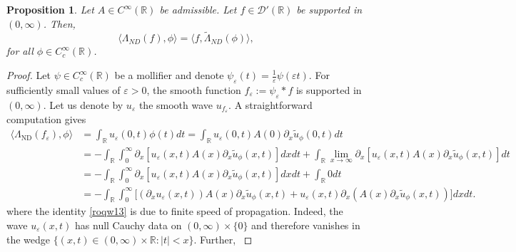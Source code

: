 \documentclass[10pt,a4paper]{article}
\theoremstyle{plain}
\newtheorem{proposition}[theorem]{Proposition}
\theoremstyle{definition}
\theoremstyle{remark}
\numberwithin{equation}{section}
\newcommand{\R}{\mathbb{R}}
\newcommand{\ND}{\Lambda_{\text{ND}}}
\begin{document}
\begin{proposition}\label{prop:integration-by-parts}
Let $A \in C^\infty(\R)$ be admissible. 
Let $f \in \mathcal{D}'(\R)$ be supported in $(0,\infty)$. 
Then, 
  \begin{equation}
  \langle \Lambda_{ND} (f), \phi \rangle =    \langle f , \tilde\Lambda_{ND} ( \phi )  \rangle, 
  \end{equation}
   {for all   $\phi \in C_c^\infty(\R)$.}
\end{proposition}
\begin{proof}
Let $\psi  \in C_c^\infty(\R)$ be a mollifier and denote $\psi_\varepsilon(t) = \frac{1}{\varepsilon} \psi ( \varepsilon t)$. 
For  sufficiently small values of $\varepsilon >0 $, the smooth function $f_\varepsilon := \psi_\varepsilon *  f $ is supported in $(0,\infty)$. 
Let us denote by $u_\varepsilon  $ the smooth wave $u_{f_\varepsilon}$. 
A straightforward computation gives 
\begin{align}
\langle  \ND (f_\varepsilon), \phi \rangle &= \int_{\R} u_{\varepsilon} (0,t)  \phi (t) dt =  \int_{\R} u_{\varepsilon} (0,t) A(0) \partial_x \tilde{u}_{\phi} (0,t)   dt \\
& {= - \int_{\R} \int_0^\infty   \partial_x [   u_{\varepsilon} (x,t)  A(x)  \partial_x \tilde{u}_{\phi} (x,t)   ]  dx dt 
+
 \int_{\R} \lim_{x \to \infty}  \partial_x [   u_{\varepsilon} (x,t)  A(x)  \partial_x \tilde{u}_{\phi} (x,t)   ]   dt} \\
&= - \int_{\R} \int_0^\infty   \partial_x [   u_{\varepsilon} (x,t)  A(x)  \partial_x \tilde{u}_{\phi} (x,t)   ]  dx dt + { \int_{\R}  0 dt } \label{roqw13} \\
&= -\int_{\R}\int_0^\infty  \bigg[     ( \partial_x u_{\varepsilon} (x,t)   ) A(x)  \partial_x \tilde{u}_{\phi} (x,t)   +  u_{\varepsilon} (x,t)  \partial_x (A(x) \partial_x \tilde{u}_{\phi} (x,t) )  \bigg] dx dt. 
\end{align}
{where the  identity \eqref{roqw13} is due to finite speed of propagation. Indeed, the wave 
$u_{\varepsilon} (x,t)$ has null Cauchy data on $(0,\infty) \times \{0\}$  and therefore  vanishes in the wedge $\{(x,t) \in (0,\infty) \times \R : |t| < x\}$. Further, }
%

\end{proof}
\end{document}
